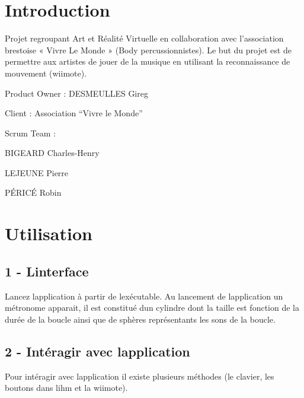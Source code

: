 \hypertarget{index_intro_sec}{}\section{Introduction}\label{index_intro_sec}
Projet regroupant Art et Réalité Virtuelle en collaboration avec l’association brestoise « Vivre Le Monde » (Body percussionnistes). Le but du projet est de permettre aux artistes de jouer de la musique en utilisant la reconnaissance de mouvement (wiimote).


\begin{DoxyItemize}
\item Product Owner \+: D\+E\+S\+M\+E\+U\+L\+L\+E\+S Gireg 
\item Client \+: Association “\+Vivre le Monde” 
\item Scrum Team \+: 
\begin{DoxyItemize}
\item B\+I\+G\+E\+A\+R\+D Charles-\/\+Henry 
\item L\+E\+J\+E\+U\+N\+E Pierre 
\item PÉ\+R\+I\+CÉ Robin
\end{DoxyItemize}
\end{DoxyItemize}\hypertarget{index_install_sec}{}\section{Utilisation}\label{index_install_sec}
\hypertarget{index_step1}{}\subsection{1 -\/ L\textquotesingle{}interface}\label{index_step1}
Lancez l\textquotesingle{}application à partir de l\textquotesingle{}exécutable. Au lancement de l\textquotesingle{}application un métronome apparait, il est constitué d\textquotesingle{}un cylindre dont la taille est fonction de la durée de la boucle ainsi que de sphères représentants les sons de la boucle.

\hypertarget{index_step2}{}\subsection{2 -\/ Intéragir avec l\textquotesingle{}application}\label{index_step2}
Pour intéragir avec l\textquotesingle{}application il existe plusieurs méthodes (le clavier, les boutons dans l\textquotesingle{}ihm et la wiimote).


